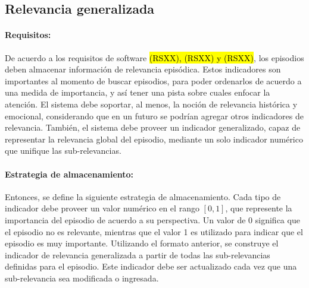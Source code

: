 

\subsection{Relevancia generalizada}

\paragraph{Requisitos:}
De acuerdo a los requisitos de software \hl{(RSXX), (RSXX) y (RSXX)}, los episodios deben almacenar información de relevancia episódica. Estos indicadores son importantes al momento de buscar episodios, para poder ordenarlos de acuerdo a una medida de importancia, y así tener una pista sobre cuales enfocar la atención. El sistema debe soportar, al menos, la noción de relevancia histórica y emocional, considerando que en un futuro se podrían agregar otros indicadores de relevancia. También, el sistema debe proveer un indicador generalizado, capaz de representar la relevancia global del episodio, mediante un solo indicador numérico que unifique las sub-relevancias.


\paragraph{Estrategia de almacenamiento:}
Entonces, se define la siguiente estrategia de almacenamiento. Cada tipo de indicador debe proveer un valor numérico en el rango $[0, 1]$, que represente la importancia del episodio de acuerdo a su perspectiva. Un valor de 0 significa que el episodio no es relevante, mientras que el valor 1 es utilizado para indicar que el episodio es muy importante. Utilizando el formato anterior, se construye el indicador de relevancia generalizada a partir de todas las sub-relevancias definidas para el episodio. Este indicador debe ser actualizado cada vez que una sub-relevancia sea modificada o ingresada.


